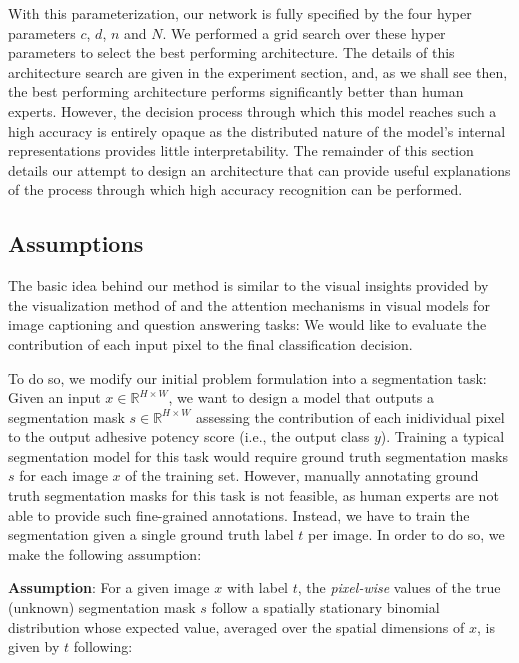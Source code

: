\documentclass[10pt,twocolumn,letterpaper]{article}
\begin{document}
With this parameterization, our network is fully specified by the four hyper parameters $c$, $d$, $n$ and $N$.
We performed a grid search over these hyper parameters to select the best performing architecture.
The details of this architecture search are given in the experiment section,
and, as we shall see then, the best performing architecture performs significantly better than human experts.
However, the decision process through which this model reaches such a high accuracy is entirely opaque
as the distributed nature of the model's internal representations provides little interpretability.
The remainder of this section details our attempt to design an architecture that can provide 
useful explanations of the process through which high accuracy recognition can be performed.

\subsection{Assumptions}
The basic idea behind our method is similar to the visual insights provided by the
visualization method of \cite{long2015fully}\cite{He2016CVPR} and the attention mechanisms in visual models 
for image captioning\cite{you2016image} and question answering tasks:
We would like to evaluate the contribution of each input pixel to the final classification decision. 

To do so, we modify our initial problem formulation into a segmentation task:
Given an input $x \in \mathbb{R}^{H \times W}$, we want to design a model that outputs 
a segmentation mask $s \in \mathbb{R}^{H \times W}$ assessing the contribution of each inidividual pixel to the output adhesive potency score (i.e., the output class $y$).
Training a typical segmentation model for this task would require ground truth 
segmentation masks $s$ for each image $x$ of the training set.
However, manually annotating ground truth segmentation masks for this task is not feasible, 
as human experts are not able to provide such fine-grained annotations.
Instead, we have to train the segmentation given a single ground truth label $t$ per image.
In order to do so, we make the following assumption:

\textbf{Assumption}: 
For a given image $x$ with label $t$, 
the \textit{pixel-wise} values of the true (unknown) segmentation mask $s$
follow a spatially stationary binomial distribution whose expected value, 
averaged over the spatial dimensions of $x$, is given by $t$ following:
\end{document}
